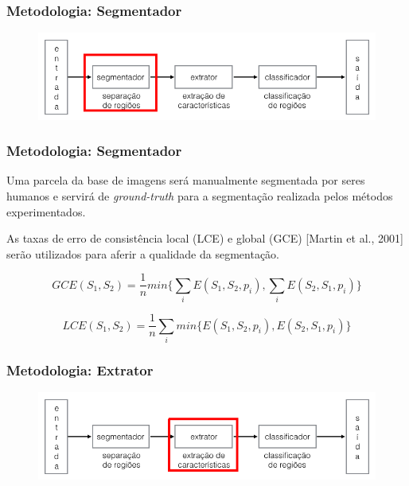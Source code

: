 \documentclass[t]{beamer}
\begin{document}
\begin{frame}[c]
	\frametitle{Metodologia: Segmentador}
	\begin{figure}[h]
    	\includegraphics[width=\textwidth]{imgs/arquitetura_2}
	\end{figure}
\end{frame}

\begin{frame}[c]

	\frametitle{Metodologia: Segmentador}

	Uma parcela da base de imagens será manualmente segmentada por seres humanos e servirá de \textit{ground-truth} para a segmentação realizada pelos métodos experimentados.

	\vspace{0.5cm}

	As taxas de erro de consistência local (LCE) e global (GCE) [Martin et al., 2001] serão utilizados para aferir a qualidade da segmentação.

	\begin{equation*}
		\displaystyle GCE(S_1,S_2) = \frac{1}{n} min \biggl\{ \sum_{i} E(S_1,S_2,p_i), \sum_{i} E(S_2,S_1,p_i) \biggr\}
	\end{equation*}

	\begin{equation*}
		\displaystyle LCE(S_1,S_2) = \frac{1}{n} \sum_{i} min \biggl\{ E(S_1,S_2,p_i), E(S_2,S_1,p_i) \biggr\}
	\end{equation*}
\end{frame}

\begin{frame}[c]
	\frametitle{Metodologia: Extrator}
	\begin{figure}[h]
    	\includegraphics[width=\textwidth]{imgs/arquitetura_3}
	\end{figure}
\end{frame}
\end{document}
